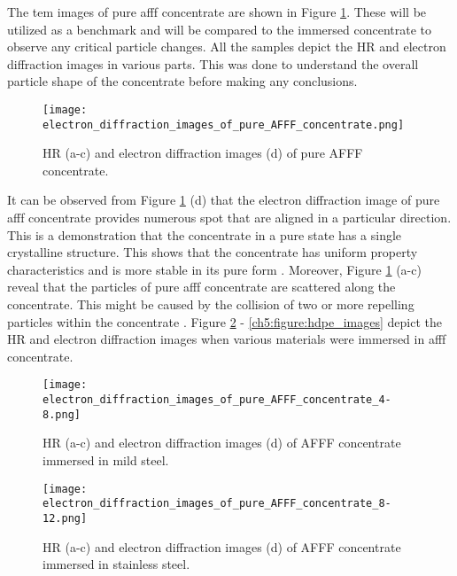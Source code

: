The \acrshort{tem} images of pure \acrshort{afff} concentrate are shown in Figure \ref{ch5:figure:pure_afff_images}. These will be utilized as a benchmark and will be compared to the immersed concentrate to observe any critical particle changes. All the samples depict the HR and electron diffraction images in various parts. This was done to understand the overall particle shape of the concentrate before making any conclusions. 

\begin{figure}[H]
\centering
\texttt{[image: electron\_diffraction\_images\_of\_pure\_AFFF\_concentrate.png]}

\caption{HR (a-c) and electron diffraction images (d) of pure AFFF concentrate.}
\label{ch5:figure:pure_afff_images}
\end{figure}

It can be observed from Figure \ref{ch5:figure:pure_afff_images} (d) that the electron diffraction image of pure \acrshort{afff} concentrate provides numerous spot that are aligned in a particular direction. This is a demonstration that the concentrate in a pure state has a single crystalline structure. This shows that the concentrate has uniform property characteristics and is more stable in its pure form \cite{coates1996interpretation}.  Moreover, Figure \ref{ch5:figure:pure_afff_images} (a-c) reveal that the particles of pure \acrshort{afff} concentrate are scattered along the concentrate. This might be caused by the collision of two or more repelling particles within the concentrate \cite{bellamy1980infrared}. Figure \ref{ch5:figure:mild_steel_images} - \ref{ch5:figure:hdpe_images} depict the HR and electron diffraction images when various materials were immersed in \acrshort{afff} concentrate. 
  
\begin{figure}[H]
\centering

\texttt{[image: electron\_diffraction\_images\_of\_pure\_AFFF\_concentrate\_4-8.png]}

\caption{HR (a-c) and electron diffraction images (d) of AFFF concentrate immersed in mild steel.}
\label{ch5:figure:mild_steel_images}
\end{figure}

\begin{figure}[H]
\centering

\texttt{[image: electron\_diffraction\_images\_of\_pure\_AFFF\_concentrate\_8-12.png]}

\caption{HR (a-c) and electron diffraction images (d) of AFFF concentrate immersed in stainless steel.}
\label{ch5:figure:stainless_steel_images}
\end{figure}

